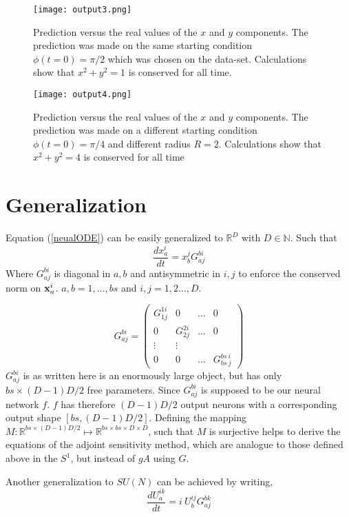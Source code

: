\documentclass[12pt,a4paper]{article}
\begin{document}
\begin{figure}[h]
    \centering
    \texttt{[image: output3.png]}
    \caption{Prediction versus the real values of the $x$ and $y$ components. The prediction was made on the same starting condition $\phi(t=0) = \pi/2$ which was chosen on the data-set. Calculations show that $x^2+y^2=1$ is conserved for all time.}
    \label{fig:fig3}
\end{figure}

\begin{figure}[h]
    \centering
    \texttt{[image: output4.png]}
    \caption{Prediction versus the real values of the $x$ and $y$ components. The prediction was made on a different starting condition $\phi(t=0) = \pi/4$ and different radius $R=2$. Calculations show that $x^2+y^2=4$ is conserved for all time}
    \label{fig:fig4}
\end{figure}


\section{Generalization}
Equation (\ref{neualODE}) can be easily generalized to $\mathbb{R}^D$ with $D\in \mathbb{N}$. Such that 
$$
\frac{d x^i_a}{dt} = x^j_b G^{bi}_{aj}
$$
Where $G^{bi}_{aj}$ is diagonal in $a, b$ and antisymmetric in $i,j$ to enforce the conserved norm on $\textbf{x}^i_a$. $a,b = 1, \ldots ,bs$ and $i,j= 1,2\ldots,D$. 

$$
G^{bi}_{aj} = \begin{pmatrix}
G^{1i}_{1j} & 0 & \ldots & 0 \\
0 & G^{2i}_{2j} & \ldots  & 0 \\
\vdots & \vdots \\
0 & 0 & \ldots  & G^{bs\ i}_{bs\ j}
\end{pmatrix}
$$
$G^{bi}_{aj}$ is as written here is an enormously large object, but has only $bs \times (D-1)D/2$ free parameters. Since $G^{bi}_{aj}$ is supposed to be our neural network $f$.
$f$ has therefore $(D-1)D/2$ output neurons with a corresponding output shape $[bs,(D-1)D/2]$. 
Defining the mapping $M:\mathbb{R}^{bs \times (D-1)D/2} \mapsto  \mathbb{R}^{bs \times bs \times D \times D }$, such that $M$ is surjective helps to derive the equations of the adjoint sensitivity method, which are analogue to those defined above in the $S^1$, but instead of $gA$ using $G$.

\break
Another generalization to $SU(N)$ can be achieved by writing,
\begin{equation}
\label{SUN}
	\frac{d U^{ik}_a}{dt} = i \ U^{ij}_b G^{bk}_{aj}
\end{equation}
\end{document}
